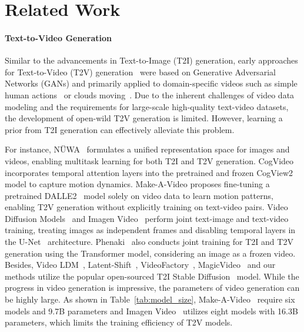 \section{Related Work}

\paragraph{Text-to-Video Generation}

Similar to the advancements in Text-to-Image (T2I) generation, early approaches for Text-to-Video (T2V) generation~\cite{li2018video, mittal2017sync, pan2017create} were based on Generative Adversarial Networks (GANs) and primarily applied to domain-specific videos such as simple human actions~\cite{ucf101} or clouds moving~\cite{time-lapse}. Due to the inherent challenges of video data modeling and the requirements for large-scale high-quality text-video datasets, the development of open-wild T2V generation is limited. However, learning a prior from T2I generation can effectively alleviate this problem.

For instance, NÜWA~\cite{wu2022nuwa} formulates a unified representation space for images and videos, enabling multitask learning for both T2I and T2V generation. CogVideo~\cite{hong2022cogvideo} incorporates temporal attention layers into the pretrained and frozen CogView2~\cite{ding2022cogview2} model to capture motion dynamics. Make-A-Video \cite{singer2022make} proposes fine-tuning a pretrained DALLE2~\cite{dalle} model solely on video data to learn motion patterns, enabling T2V generation without explicitly training on text-video pairs. Video Diffusion Models~\cite{vdm} and Imagen Video~\cite{ho2022imagenvideo} perform joint text-image and text-video training, treating images as independent frames and disabling temporal layers in the U-Net~\cite{unet} architecture. Phenaki~\cite{villegas2022phenaki} also conducts joint training for T2I and T2V generation using the Transformer model, considering an image as a frozen video. Besides, Video LDM~\cite{videoLDM}, Latent-Shift~\cite{latentshift}, VideoFactory~\cite{videofactory}, MagicVideo~\cite{magicvideo} and our methods utilize the popular open-sourced T2I Stable Diffusion~\cite{stablediffusion} model. While the progress in video generation is impressive, the parameters of video generation can be highly large. As shown in Table~\ref{tab:model_size}, Make-A-Video~\cite{singer2022make} require six models and 9.7B parameters and Imagen Video~\cite{ho2022imagenvideo} utilizes eight models with 16.3B parameters, which limits the training efficiency of T2V models.

